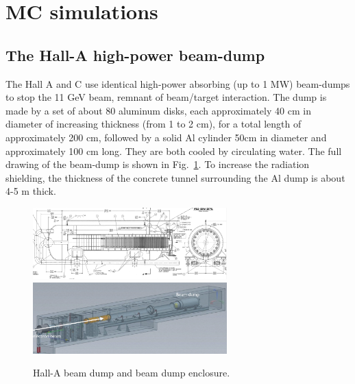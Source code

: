 \section{MC simulations}
\label{sec:sim}
\subsection{The Hall-A high-power beam-dump}
The Hall A and C use identical high-power absorbing (up to 1 MW)  beam-dumps to stop the 11 GeV beam, remnant of beam/target interaction. The dump is made by a set of about 80 aluminum disks, each
approximately 40 cm in diameter of increasing thickness (from 1 to 2 cm), for a total
length of approximately 200 cm, followed by a solid Al cylinder 50cm in diameter
and approximately 100 cm long. They are both cooled by circulating water. The full
drawing of the beam-dump is shown in Fig.~\ref{fig:bd}. To increase the radiation shielding,
the thickness of the concrete tunnel surrounding the Al dump is about 4-5 m thick.

\begin{figure}[h!] 
\center
\includegraphics[width=7.5cm]{figs/beam-dump-br.pdf}
\includegraphics[width=7.5cm]{figs/beam-dump.pdf}
\caption{Hall-A beam dump and beam dump enclosure. }
\label{fig:bd}
\end{figure}

